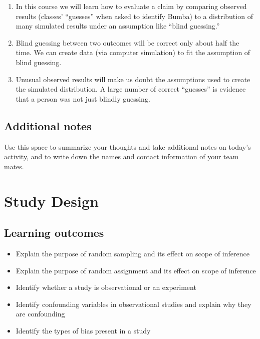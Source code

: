 \documentclass[
]{report}
\begin{document}
\begin{enumerate}
\def\labelenumi{\arabic{enumi}.}
\item
  In this course we will learn how to evaluate a claim by comparing observed results (classes' ``guesses'' when asked to identify Bumba) to a distribution of many simulated results under an assumption like ``blind guessing.''
\item
  Blind guessing between two outcomes will be correct only about half the time. We can create data (via computer simulation) to fit the assumption of blind guessing.
\item
  Unusual observed results will make us doubt the assumptions used to create the simulated distribution. A large number of correct ``guesses'' is evidence that a person was not just blindly guessing.
\end{enumerate}

\hypertarget{additional-notes}{%
\section{Additional notes}\label{additional-notes}}

Use this space to summarize your thoughts and take additional notes on today's activity, and to write down the names and contact information of your team mates.

\hypertarget{study-design}{%
\chapter{Study Design}\label{study-design}}

\hypertarget{learning-outcomes}{%
\section{Learning outcomes}\label{learning-outcomes}}

\begin{itemize}
\item
  Explain the purpose of random sampling and its effect on scope of inference
\item
  Explain the purpose of random assignment and its effect on scope of inference
\item
  Identify whether a study is observational or an experiment
\item
  Identify confounding variables in observational studies and explain why they are confounding
\item
  Identify the types of bias present in a study
\end{itemize}
\end{document}
